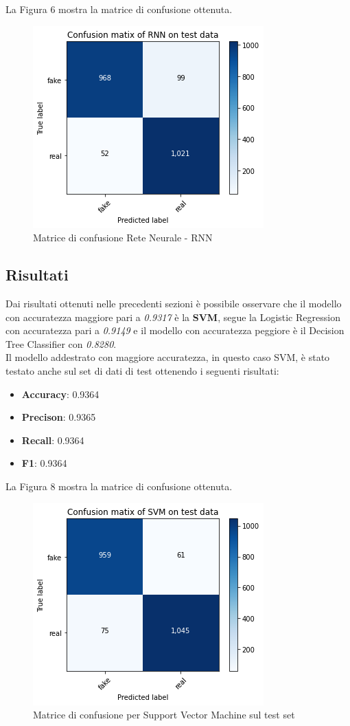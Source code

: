 \documentclass{article}
\begin{document}
\noindent
La Figura 6 mostra la matrice di confusione ottenuta.
\begin{figure}[H]
\includegraphics[width=0.5\linewidth]{RNN.png}
\centering
\caption{Matrice di confusione Rete Neurale - RNN}
\label{fig:bytepost}
\end{figure}


\subsection{Risultati}
Dai risultati ottenuti nelle precedenti sezioni è possibile osservare che il modello con accuratezza maggiore pari a \textit{0.9317} è la \textbf{SVM}, segue la Logistic Regression con accuratezza pari a \textit{0.9149} e il modello con accuratezza peggiore è il Decision Tree Classifier con \textit{0.8280}. \\
Il modello addestrato con maggiore accuratezza, in questo caso SVM, è stato testato anche sul set di dati di test ottenendo i seguenti risultati:
\begin{itemize}[noitemsep]
  \item \textbf{Accuracy}: 0.9364
  \item \textbf{Precison}: 0.9365
  \item \textbf{Recall}: 0.9364
  \item \textbf{F1}: 0.9364
 \end{itemize}

\noindent
La Figura 8 mostra la matrice di confusione ottenuta.
\begin{figure}[H]
\includegraphics[width=0.5\linewidth]{SVM_test.png}
\centering
\caption{Matrice di confusione per Support Vector Machine sul test set}
\label{fig:bytepost}
\end{figure}
\end{document}
